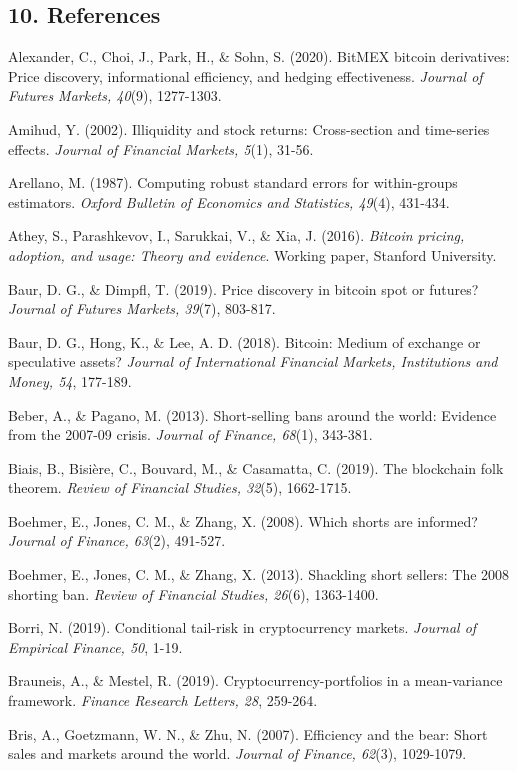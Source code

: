 \documentclass[
]{article}
\begin{document}
\subsection{10. References}\label{10-references}

Alexander, C., Choi, J., Park, H., \& Sohn, S. (2020). BitMEX bitcoin
derivatives: Price discovery, informational efficiency, and hedging
effectiveness. \emph{Journal of Futures Markets, 40}(9), 1277-1303.

Amihud, Y. (2002). Illiquidity and stock returns: Cross-section and
time-series effects. \emph{Journal of Financial Markets, 5}(1), 31-56.

Arellano, M. (1987). Computing robust standard errors for within-groups
estimators. \emph{Oxford Bulletin of Economics and Statistics, 49}(4),
431-434.

Athey, S., Parashkevov, I., Sarukkai, V., \& Xia, J. (2016).
\emph{Bitcoin pricing, adoption, and usage: Theory and evidence}.
Working paper, Stanford University.

Baur, D. G., \& Dimpfl, T. (2019). Price discovery in bitcoin spot or
futures? \emph{Journal of Futures Markets, 39}(7), 803-817.

Baur, D. G., Hong, K., \& Lee, A. D. (2018). Bitcoin: Medium of exchange
or speculative assets? \emph{Journal of International Financial Markets,
Institutions and Money, 54}, 177-189.

Beber, A., \& Pagano, M. (2013). Short-selling bans around the world:
Evidence from the 2007-09 crisis. \emph{Journal of Finance, 68}(1),
343-381.

Biais, B., Bisière, C., Bouvard, M., \& Casamatta, C. (2019). The
blockchain folk theorem. \emph{Review of Financial Studies, 32}(5),
1662-1715.

Boehmer, E., Jones, C. M., \& Zhang, X. (2008). Which shorts are
informed? \emph{Journal of Finance, 63}(2), 491-527.

Boehmer, E., Jones, C. M., \& Zhang, X. (2013). Shackling short sellers:
The 2008 shorting ban. \emph{Review of Financial Studies, 26}(6),
1363-1400.

Borri, N. (2019). Conditional tail-risk in cryptocurrency markets.
\emph{Journal of Empirical Finance, 50}, 1-19.

Brauneis, A., \& Mestel, R. (2019). Cryptocurrency-portfolios in a
mean-variance framework. \emph{Finance Research Letters, 28}, 259-264.

Bris, A., Goetzmann, W. N., \& Zhu, N. (2007). Efficiency and the bear:
Short sales and markets around the world. \emph{Journal of Finance,
62}(3), 1029-1079.
\end{document}
